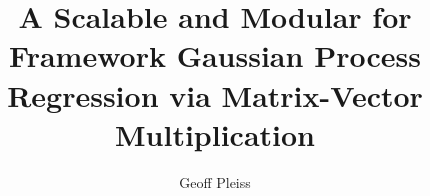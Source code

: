 \documentclass[phd,tocprelim,dvipsnames]{cornell}
\title{A Scalable and Modular for Framework Gaussian Process Regression via Matrix-Vector Multiplication}
\author{Geoff Pleiss}
\begin{document}
\maketitle
\makecopyright


\begin{abstract}
  
\end{abstract}

\begin{biosketch}
  
\end{biosketch}

\begin{dedication}
  
\end{dedication}

\begin{acknowledgements}
  
\end{acknowledgements}

\contentspage
\tablelistpage
\figurelistpage
{}
\listofalgorithms
\newpage

\normalspacing \setcounter{page}{1} 
\pagestyle{cornell} \addtolength{\parskip}{0.5\baselineskip}









\appendix







\end{document}
